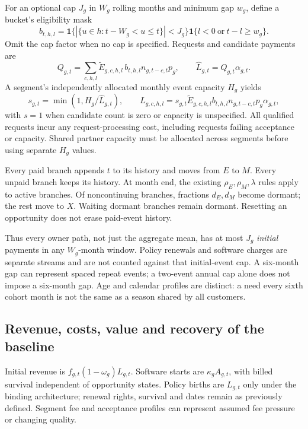 \documentclass[11pt,a4paper]{article}
\begin{document}
For an optional cap $J_g$ in $W_g$ rolling months and minimum gap $w_g$, define a bucket's eligibility mask
\begin{equation}
 b_{t,h,l}=\mathbf1\{|\{u\in h:t-W_g<u\leq t\}|<J_g\}
            \mathbf1\{l<0\ \text{or}\ t-l\geq w_g\}.
\end{equation}
Omit the cap factor when no cap is specified. Requests and candidate payments are
\begin{equation}
 Q_{g,t}=\sum_{c,h,l}\widetilde E_{g,c,h,l}\,b_{t,h,l}n_{g,t-c,t}p_g,
 \qquad \widehat L_{g,t}=Q_{g,t}\alpha_{g,t}.
\end{equation}
A segment's independently allocated monthly event capacity $H_g$ yields
\begin{equation}
 s_{g,t}=\min(1,H_g/\widehat L_{g,t}),
 \qquad L_{g,c,h,l}=s_{g,t}\widetilde E_{g,c,h,l}b_{t,h,l}n_{g,t-c,t}p_g\alpha_{g,t},
\end{equation}
with $s=1$ when candidate count is zero or capacity is unspecified. All qualified requests incur any request-processing cost, including requests failing acceptance or capacity. Shared partner capacity must be allocated across segments before using separate $H_g$ values.

Every paid branch appends $t$ to its history and moves from $E$ to $M$. Every unpaid branch keeps its history. At month end, the existing $\rho_E,\rho_M,\lambda$ rules apply to active branches. Of noncontinuing branches, fractions $d_E,d_M$ become dormant; the rest move to $X$. Waiting dormant branches remain dormant. Resetting an opportunity does not erase paid-event history.

Thus every owner path, not just the aggregate mean, has at most $J_g$ \emph{initial} payments in any $W_g$-month window. Policy renewals and software charges are separate streams and are not counted against that initial-event cap. A six-month gap can represent spaced repeat events; a two-event annual cap alone does not impose a six-month gap. Age and calendar profiles are distinct: a need every sixth cohort month is not the same as a season shared by all customers.

\subsection{Revenue, costs, value and recovery of the baseline}
Initial revenue is $f_{g,t}(1-\omega_g)L_{g,t}$. Software starts are $\kappa_gA_{g,t}$, with billed survival independent of opportunity states. Policy births are $L_{g,t}$ only under the binding architecture; renewal rights, survival and dates remain as previously defined. Segment fee and acceptance profiles can represent assumed fee pressure or changing quality.
\end{document}
